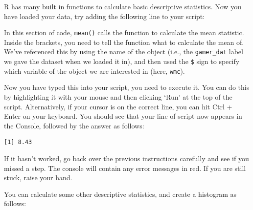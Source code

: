 \documentclass[
  a4paper,
  DIV=11,
  numbers=noendperiod]{scrreprt}
\newenvironment{Shaded}{\begin{snugshade}}{\end{snugshade}}
\newcommand{\FunctionTok}[1]{\textcolor[rgb]{0.28,0.35,0.67}{#1}}
\newcommand{\NormalTok}[1]{\textcolor[rgb]{0.00,0.23,0.31}{#1}}
\newcommand{\SpecialCharTok}[1]{\textcolor[rgb]{0.37,0.37,0.37}{#1}}
\begin{document}
R has many built in functions to calculate basic descriptive statistics.
Now you have loaded your data, try adding the following line to your
script:

\begin{Shaded}
\end{Shaded}

In this section of code, \texttt{mean()} calls the function to calculate
the mean statistic. Inside the brackets, you need to tell the function
what to calculate the mean of. We've referenced this by using the name
of the object (i.e., the \texttt{gamer\_dat} label we gave the dataset
when we loaded it in), and then used the \texttt{\$} sign to specify
which variable of the object we are interested in (here, \texttt{wmc}).

Now you have typed this into your script, you need to execute it. You
can do this by highlighting it with your mouse and then clicking `Run'
at the top of the script. Alternatively, if your cursor is on the
correct line, you can hit Ctrl + Enter on your keyboard. You should see
that your line of script now appears in the Console, followed by the
answer as follows:

\begin{Shaded}
\end{Shaded}

\begin{verbatim}
[1] 8.43
\end{verbatim}

If it hasn't worked, go back over the previous instructions carefully
and see if you missed a step. The console will contain any error
messages in red. If you are still stuck, raise your hand.

You can calculate some other descriptive statistics, and create a
histogram as follows:

\begin{Shaded}
\end{Shaded}
\end{document}

